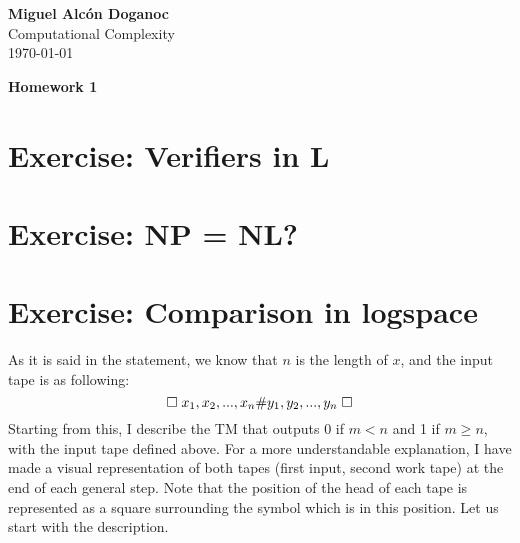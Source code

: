 \documentclass[a4paper, 10pt]{article}
\begin{document}
\noindent
\begin{flushright}
    \large\textbf{Miguel Alcón Doganoc} \\
    Computational Complexity \\
    \today
\end{flushright}

\noindent
{\huge{\textbf{Homework 1}}}

\section{Exercise: Verifiers in L}
\section{Exercise: NP = NL?}
\section{Exercise: Comparison in logspace}

As it is said in the statement, we know that $n$ is the length of $x$, and the input tape is as following:
\[
    \square \hspace{1mm} x_1,x_2,...,x_n \# y_1,y_2,...,y_n \hspace{1mm} \square
\]
Starting from this, I describe the TM that outputs 0 if $m < n$ and 1 if $m \geq n$, with the input tape defined above. For a more understandable explanation, I have made a visual representation of both tapes (first input, second work tape) at the end of each general step. Note that the position of the head of each tape is represented as a square surrounding the symbol which is in this position. Let us start with the description.
\end{document}
